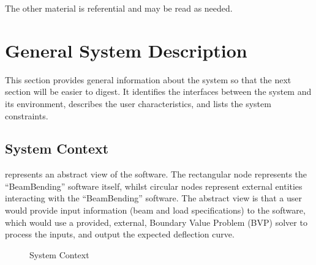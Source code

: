 \documentclass[12pt]{article}
\begin{document}
\noindent{}The other material is referential and may be read as needed.

\newpage


\section{General System Description}
\label{sec_gsd}

This section provides general information about the system so that the next
section will be easier to digest. It identifies the interfaces between the
system and its environment, describes the user characteristics, and lists the
system constraints.

\subsection{System Context}

 represents an abstract view of the software. The
rectangular node represents the ``BeamBending'' software itself, whilst circular
nodes represent external entities interacting with the ``BeamBending'' software.
The abstract view is that a user would provide input information (beam and load
specifications) to the software, which would use a provided, external, Boundary
Value Problem (BVP) solver to process the inputs, and output the expected
deflection curve.

\begin{figure}[h!]
    \begin{center}
    \end{center}
    \caption{System Context}
    \label{Fig_SystemContext}
\end{figure}
\end{document}

